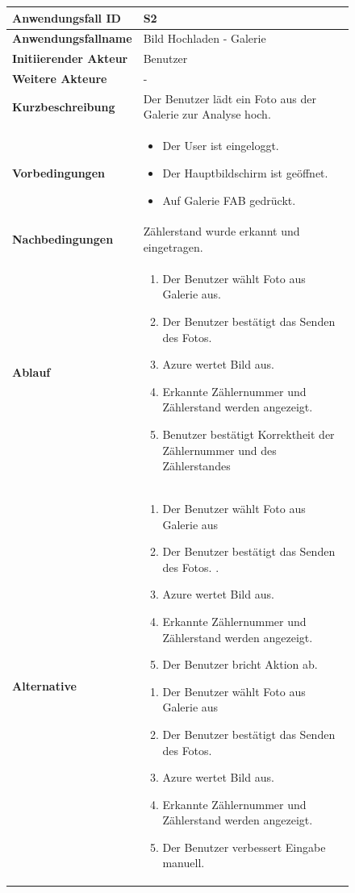 \begin{figure}[h]
	\centering
	\begin{tabularx}{\textwidth}{ X | X }
		\textbf{Anwendungsfall ID} & S2 \\ \hline
		\textbf{Anwendungsfallname} & Bild Hochladen - Galerie \\ \hline
		\textbf{Initiierender Akteur} & Benutzer \\ \hline
		\textbf{Weitere Akteure} & - \\ \hline
		\textbf{Kurzbeschreibung} & Der Benutzer lädt ein Foto aus der Galerie zur Analyse hoch. \\ \hline
		\textbf{Vorbedingungen} &
		\begin {itemize}
			\item Der User ist eingeloggt.
			\item Der Hauptbildschirm ist geöffnet.
			\item Auf Galerie FAB gedrückt.
		\end{itemize}\\ \hline
		\textbf{Nachbedingungen} & Zählerstand wurde erkannt und eingetragen. \\ \hline
		\textbf{Ablauf} &
		\begin{enumerate}
			\item Der Benutzer wählt Foto aus Galerie aus.
			\item Der Benutzer bestätigt das Senden des Fotos. 
			\item Azure wertet Bild aus.
			\item Erkannte Zählernummer und Zählerstand werden angezeigt. 
			\item Benutzer bestätigt Korrektheit der Zählernummer und des Zählerstandes
		\end{enumerate} \\ \hline
		\textbf{Alternative} & 
		\begin{enumerate}
			\item Der Benutzer wählt Foto aus Galerie aus 
			\item Der Benutzer bestätigt das Senden des Fotos. . 
			\item Azure wertet Bild aus. 
			\item Erkannte Zählernummer und Zählerstand werden angezeigt. 
			\item Der Benutzer bricht Aktion ab. 
		\end{enumerate}
		\begin{enumerate}
			\item Der Benutzer wählt Foto aus Galerie aus
			\item Der Benutzer bestätigt das Senden des Fotos. 
			\item Azure wertet Bild aus.
			\item Erkannte Zählernummer und Zählerstand werden angezeigt. 
			\item Der Benutzer verbessert Eingabe manuell.
		\end{enumerate} \\
	\end{tabularx}
\end{figure}
